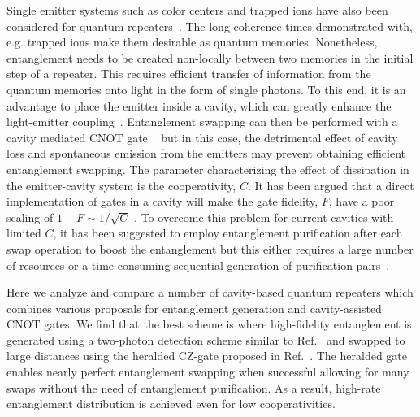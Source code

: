 Single emitter systems such as color centers and trapped ions have also been
considered for quantum repeaters~\cite{childress,sangouard2}. The long coherence
times demonstrated with, e.g. trapped ions make them desirable as quantum
memories. Nonetheless, entanglement needs to be created non-locally between two
memories in the initial step of a repeater. This requires efficient transfer of
information from the quantum memories onto light in the form of single photons.
To this end, it is an advantage to place the emitter inside a cavity, which can
greatly enhance the light-emitter coupling~\cite{acin,ritter}. Entanglement
swapping can then be performed with a cavity mediated CNOT gate
~\cite{pellizari,haroche1} but in this case, the detrimental effect of cavity loss
and spontaneous emission from the emitters may prevent obtaining efficient
entanglement swapping. The parameter characterizing the effect of dissipation in
the emitter-cavity system is the cooperativity, $C$. It has been argued that a
direct implementation of gates in a cavity will make the gate fidelity, $F$,
have a poor scaling of $1-F\sim 1/\sqrt{C}$ \cite{kastoryano,Anders2prl}. To
overcome this problem for current cavities with limited $C$, it has been
suggested to employ entanglement purification after each swap operation to boost
the entanglement but this either requires a large number of resources or a time
consuming sequential generation of purification
pairs~\cite{bennett,deutsch,duan4,pan}.

Here we analyze and compare a number of cavity-based quantum repeaters which
combines various proposals for entanglement generation and cavity-assisted CNOT
gates. We find that the best scheme is where high-fidelity entanglement is
generated using a two-photon detection scheme similar to Ref.~\cite{kimble2} and
swapped to large distances using the heralded CZ-gate proposed in
Ref.~\cite{Borregaard2015a}. The heralded gate enables nearly perfect entanglement
swapping when successful allowing for many swaps without the need of
entanglement purification. As a result, high-rate entanglement distribution is
achieved even for low cooperativities.

